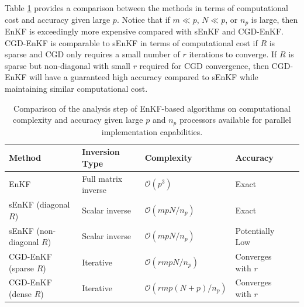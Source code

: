 \documentclass[11p]{elsarticle}
\numberwithin{equation}{section}
\begin{document}
    Table \ref{all_method} provides a comparison between the methods in terms of computational cost and accuracy given large $p$.  Notice that if $m\ll p$, $N\ll p$, or $n_p$ is large, then EnKF is exceedingly more expensive compared with sEnKF and CGD-EnKF.  CGD-EnKF is comparable to sEnKF in terms of computational cost if $R$ is sparse and CGD only requires a small number of $r$ iterations to converge.  If $R$ is sparse but non-diagonal with small $r$ required for CGD convergence, then CGD-EnKF will have a guaranteed high accuracy compared to sEnKF while maintaining similar computational cost.
    

 \begin{table}[!h]                                           
    \centering                           
    \footnotesize                                            
    \renewcommand{\arraystretch}{1.3}                      
    \begin{tabularx}{0.95\textwidth}{@{} l l l l X @{}} 
    \toprule                                                
    \textbf{Method} & \textbf{Inversion Type} & \textbf{Complexity} & \textbf{Accuracy} \\
    \midrule
    EnKF & Full matrix inverse 
      & $\mathcal{O}(p^3)$
      & Exact  \\
    sEnKF (diagonal $R$) & Scalar inverse
      & $\mathcal{O}(mpN/ n_p)$
      & Exact \\
    sEnKF (non-diagonal $R$) & Scalar inverse
      & $\mathcal{O}(mpN/ n_p)$
      & Potentially Low \\
    CGD-EnKF (sparse $R$) & Iterative
      & $\mathcal{O}(rmpN/ n_p)$
      & Converges with $r$ \\
    CGD-EnKF (dense $R$) & Iterative 
      & $\mathcal{O}(rmp(N+p)/ n_p)$
      & Converges with $r$ \\
    \bottomrule
    \end{tabularx}
    \caption{Comparison of the analysis step of EnKF-based algorithms on computational complexity and accuracy given large $p$ and $n_p$ processors available for parallel implementation capabilities.}
    \label{all_method}
  \end{table}
 
\end{document}
